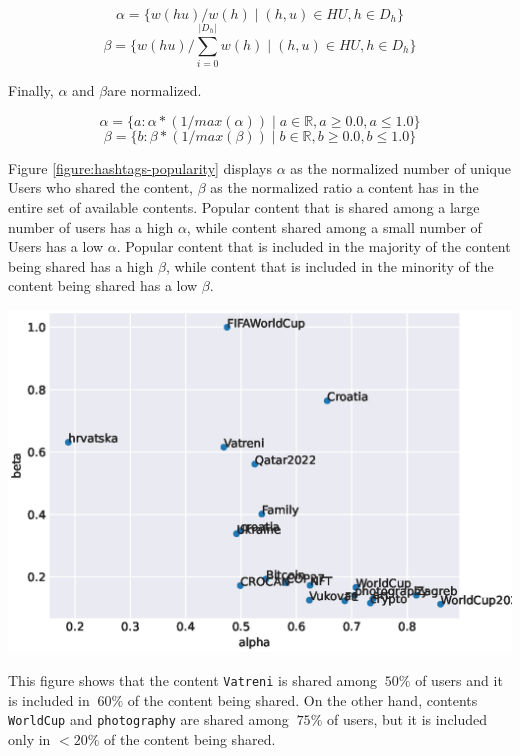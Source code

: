 \[
 \alpha = \{w(hu) / w(h) \mid (h, u)\in HU, h\in D_h\}
\]
\[
 \beta = \{w(hu) / \sum_{i=0}^{\lvert D_h\lvert} w(h) \mid (h, u)\in HU, h\in D_h\}
\]

Finally, \(\alpha\) and \(\beta\)are normalized.

\[
 \alpha = \{a\colon \alpha * (1 / max(\alpha)) \mid a\in \mathbb{R}, a\geq 0.0, a\leq 1.0\}
\]
\[
 \beta = \{b\colon \beta * (1 / max(\beta)) \mid b\in \mathbb{R}, b\geq 0.0, b\leq 1.0\}
\]


Figure \ref{figure:hashtags-popularity} displays \(\alpha\) as the normalized number of unique Users who shared the content, \(\beta\) as the normalized ratio a content has in the entire set of available contents. Popular content that is shared among a large number of users has a high \(\alpha\), while content shared among a small number of Users has a low \(\alpha\). Popular content that is included in the majority of the content being shared has a high \(\beta\), while content that is included in the minority of the content being shared has a low \(\beta\). 

\begin{center}
\includegraphics[width=16cm,keepaspectratio]{figures/hashtags-popularity.eps}
\label{figure:hashtags-popularity}
\end{center}

This figure shows that the content \texttt{Vatreni} is shared among \(~ 50\%\) of users and it is included in \(~ 60\%\) of the content being shared. On the other hand, contents \texttt{WorldCup} and \texttt{photography} are shared among \(~ 75\%\) of users, but it is included only in \(< 20\%\) of the content being shared.

